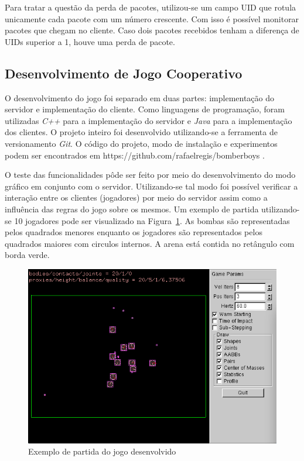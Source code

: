 \documentclass[12pt]{article}
\begin{document}
Para tratar a questão da perda de pacotes, utilizou-se um campo UID que rotula
unicamente cada pacote com um número crescente. Com isso é possível monitorar
pacotes que chegam no cliente. Caso dois pacotes recebidos tenham a diferença
de UIDs superior a 1, houve uma perda de pacote.

\subsection{Desenvolvimento de Jogo Cooperativo} \label{sub:desenvolvimento}

O desenvolvimento do jogo foi separado em duas partes: implementação do
servidor e implementação do cliente. Como linguagens de programação, foram
utilizadas \emph{C++} para a implementação do servidor e \emph{Java} para a implementação dos
clientes.  O projeto inteiro foi desenvolvido utilizando-se a ferramenta de
versionamento \emph{Git}. O código do projeto, modo de instalação e experimentos podem
ser encontrados em https://github.com/rafaelregis/bomberboys .

O teste das funcionalidades pôde ser feito por meio do desenvolvimento do modo
gráfico em conjunto com o servidor. Utilizando-se tal modo foi possível
verificar a interação entre os clientes (jogadores) por meio do servidor assim
como a influência das regras do jogo sobre os mesmos. Um exemplo de partida
utilizando-se 10 jogadores pode ser visualizado na Figura~\ref{fig:partida}. As
bombas são representadas pelos quadrados menores enquanto os jogadores são
representados pelos quadrados maiores com circulos internos. A arena está
contida no retângulo com borda verde.

\begin{figure}[ht]
  \centering
  \includegraphics[width=.8\textwidth]{img/partida.png}
  \caption{Exemplo de partida do jogo desenvolvido}
  \label{fig:partida}
\end{figure}
\end{document}
